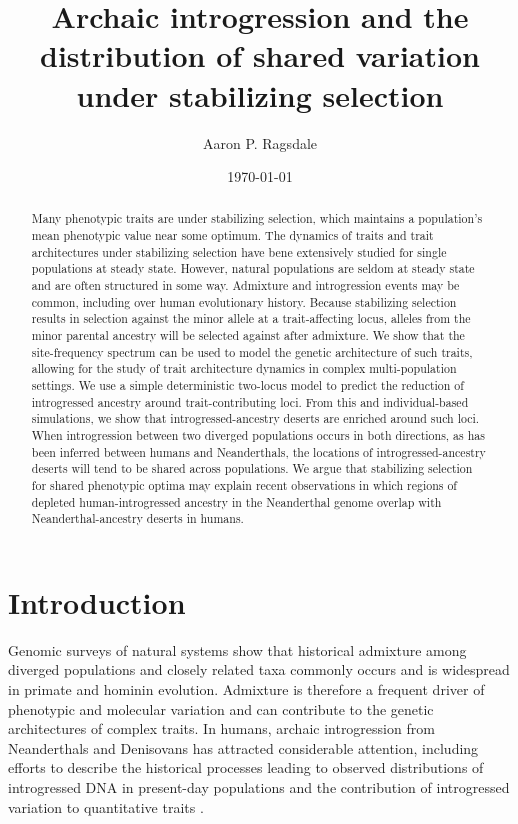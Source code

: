 \documentclass{article}
\title{Archaic introgression and the distribution
of shared variation under stabilizing selection}
\author[]{Aaron P. Ragsdale}
\affil[]{Department of Integrative Biology, University of Wisconsin--Madison, WI, USA}
\date{\today}
\begin{document}
\maketitle    


\begin{abstract}
    
    Many phenotypic traits are under stabilizing selection, which maintains a
    population's mean phenotypic value near some optimum. The dynamics of
    traits and trait architectures under stabilizing selection have bene
    extensively studied for single populations at steady state. However,
    natural populations are seldom at steady state and are often structured in
    some way. Admixture and introgression events may be common, including over
    human evolutionary history. Because stabilizing selection results in
    selection against the minor allele at a trait-affecting locus, alleles from
    the minor parental ancestry will be selected against after admixture. We
    show that the site-frequency spectrum can be used to model the genetic
    architecture of such traits, allowing for the study of trait architecture
    dynamics in complex multi-population settings. We use a simple
    deterministic two-locus model to predict the reduction of introgressed
    ancestry around trait-contributing loci. From this and individual-based
    simulations, we show that introgressed-ancestry deserts are enriched around
    such loci. When introgression between two diverged populations occurs in
    both directions, as has been inferred between humans and Neanderthals, the
    locations of introgressed-ancestry deserts will tend to be shared across
    populations. We argue that stabilizing selection for shared phenotypic
    optima may explain recent observations in which regions of depleted
    human-introgressed ancestry in the Neanderthal genome overlap with
    Neanderthal-ancestry deserts in humans.

\end{abstract}

\onehalfspacing

\section*{Introduction}

Genomic surveys of natural systems show that historical admixture among
diverged populations and closely related taxa commonly occurs
\citep{brandvain2014speciation, skoglund2015ancient, suvorov2022widespread} and
is widespread in primate \citep{tung2017contribution, sorensen2023genome} and
hominin \citep{wolf2018outstanding, peter2020100} evolution. Admixture is
therefore a frequent driver of phenotypic and molecular variation and can
contribute to the genetic architectures of complex traits. In humans, archaic
introgression from Neanderthals and Denisovans has attracted considerable
attention, including efforts to describe the historical processes leading to
observed distributions of introgressed DNA in present-day populations
\citep{prufer2014complete, villanea2019multiple, chen2020identifying} and the
contribution of introgressed variation to quantitative traits
\citep{sankararaman2016combined, wei2023lingering}.
\end{document}
